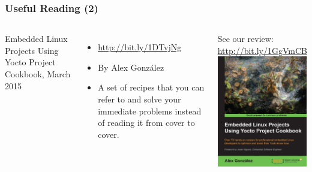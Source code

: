 \begin{frame}
  \frametitle{Useful Reading (2)}
  \begin{columns}
    Embedded Linux Projects Using Yocto Project Cookbook, March 2015
    \begin{itemize}
    \item \url{http://bit.ly/1DTvjNg}
    \item By Alex González
    \item A set of recipes that you can refer to and solve your
          immediate problems instead of reading it from cover to cover. 
    \end{itemize}
    See our review: \url{http://bit.ly/1GgVmCB}
    \includegraphics[width=\textwidth]{slides/yocto-resources/ELPYPC.jpg}
  \end{columns}
\end{frame}

